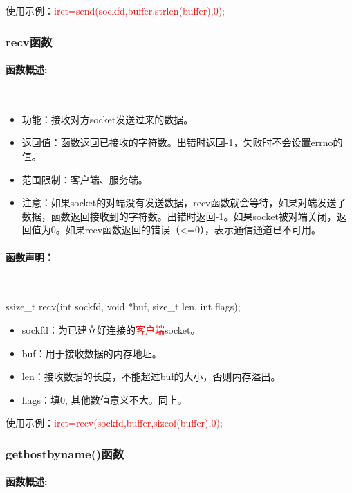 \documentclass[UTF8]{article}%
\begin{document}
使用示例：\textcolor{red}{iret=send(sockfd,buffer,strlen(buffer),0);}

\subsubsection{recv函数}

\paragraph{函数概述:}~{}

\begin{itemize}
    \item 功能：接收对方socket发送过来的数据。
    \item 返回值：函数返回已接收的字符数。出错时返回-1，失败时不会设置errno的值。
    \item 范围限制：客户端、服务端。
    \item 注意：如果socket的对端没有发送数据，recv函数就会等待，如果对端发送了数据，函数返回接收到的字符数。出错时返回-1。如果socket被对端关闭，返回值为0。如果recv函数返回的错误（<=0），表示通信通道已不可用。
\end{itemize}

\paragraph{函数声明：}~{}

ssize\_t recv(int sockfd, void *buf, size\_t len, int flags);

\begin{itemize}
    \item sockfd：为已建立好连接的\textcolor{red}{客户端}socket。
    \item buf：用于接收数据的内存地址。
    \item len：接收数据的长度，不能超过buf的大小，否则内存溢出。
    \item flags：填0, 其他数值意义不大。同上。
\end{itemize}

使用示例：\textcolor{red}{iret=recv(sockfd,buffer,sizeof(buffer),0);}

\subsubsection{gethostbyname()函数}

\paragraph{函数概述:}~{}
\end{document}
